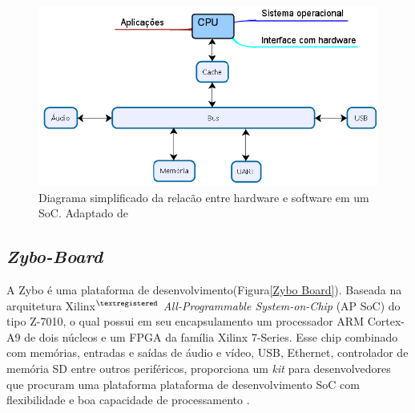 \begin{figure}[h]
	\centering
	\includegraphics[keepaspectratio=true,scale=0.5]{figuras/diaagrama-soc.png}
	\caption{Diagrama simplificado da relacão entre hardware e software em um SoC. Adaptado de \cite{cao2017post}}
	\label{diagram SoC}
\end{figure}


\subsection{\textit{Zybo-Board}}
A Zybo é uma plataforma de desenvolvimento(Figura\ref{Zybo Board}).
Baseada na arquitetura Xilinx$^{\textregistered}$ \textit{All-Programmable System-on-Chip} (AP SoC)
do tipo Z-7010, o qual possui em seu encapsulamento um processador ARM Cortex-A9 de 
dois núcleos e um FPGA da família Xilinx 7-Series. Esse chip combinado com memórias, entradas 
e saídas de áudio e vídeo, USB, Ethernet, controlador de memória SD entre outros periféricos,
proporciona um \textit{kit} para desenvolvedores que procuram uma plataforma plataforma de desenvolvimento SoC com flexibilidade e boa capacidade de processamento \cite{DigilentZybo}.  

